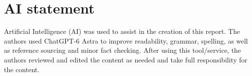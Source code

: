 \section*{AI statement}
Artificial Intelligence (AI) was used to assist in the creation of this report. The authors used ChatGPT-6 Astra to improve readability, grammar, spelling, as well as reference sourcing and minor fact checking. After using this tool/service, the authors reviewed and edited the content as needed and take full responsibility for the content.